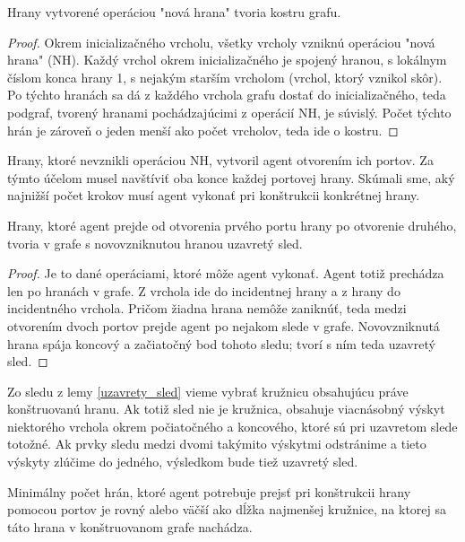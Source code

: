 \begin{lem}
Hrany vytvorené operáciou "nová hrana" tvoria kostru grafu.
\end{lem}
\begin{proof}
Okrem inicializačného vrcholu, všetky vrcholy vzniknú operáciou "nová hrana"
(NH). Každý vrchol okrem inicializačného je spojený hranou, s lokálnym číslom
konca hrany
1, s nejakým starším vrcholom (vrchol, ktorý vznikol skôr). Po týchto hranách 
sa dá
z každého vrchola grafu dostať do inicializačného, teda podgraf, 
tvorený hranami
pochádzajúcimi z operácií NH, je súvislý. 
Počet týchto hrán je zároveň o jeden menší ako počet
vrcholov, teda ide o kostru.
\end{proof}

Hrany, ktoré nevznikli operáciou NH, vytvoril agent otvorením ich portov. Za
týmto účelom musel navštíviť oba konce každej portovej hrany. Skúmali sme,
aký najnižší počet krokov musí agent vykonať pri konštrukcii konkrétnej
hrany.

\begin{lem}
\label{uzavrety_sled}
Hrany, ktoré agent prejde od otvorenia prvého portu hrany po otvorenie druhého,
tvoria v grafe s novovzniknutou hranou uzavretý sled.
\end{lem}
\begin{proof}
Je to dané operáciami, ktoré môže agent vykonať. Agent totiž prechádza len
po hranách v grafe. Z vrchola ide do incidentnej hrany a z hrany do
incidentného vrchola. Pričom žiadna hrana nemôže zaniknúť, teda medzi otvorením
dvoch portov prejde agent po nejakom slede v grafe. Novovzniknutá hrana
spája koncový a začiatočný bod tohoto sledu; tvorí s ním teda uzavretý sled.
\end{proof}

\begin{pozn}
Zo sledu z lemy \ref{uzavrety_sled} vieme vybrať kružnicu obsahujúcu práve
konštruovanú hranu. Ak totiž sled nie je kružnica, obsahuje viacnásobný
výskyt niektorého vrchola okrem počiatočného a koncového, ktoré sú pri
uzavretom slede totožné. Ak prvky sledu medzi dvomi takýmito výskytmi
odstránime a tieto výskyty zlúčime do jedného, výsledkom bude tiež uzavretý
sled.
\end{pozn}

\begin{lem}
\label{minimum}
Minimálny počet hrán, ktoré agent potrebuje prejsť pri konštrukcii 
hrany pomocou
portov je rovný alebo väčší ako dĺžka najmenšej kružnice, na ktorej sa táto
hrana v konštruovanom grafe nachádza.
\end{lem}


